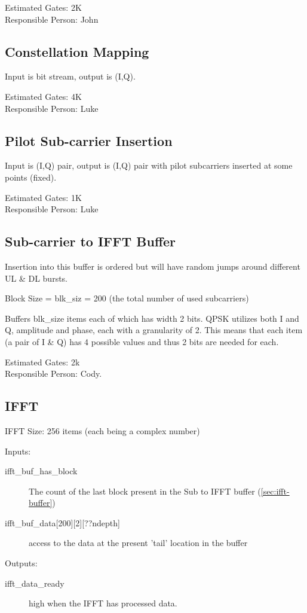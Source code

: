 \documentclass[dvips,10pt,twocolumn]{article}
\begin{document}
	Estimated Gates: 2K \\
	Responsible Person: John

	\subsection{Constellation Mapping}
	\label{sec:constellation}

	Input is bit stream, output is (I,Q).
	
	Estimated Gates: 4K \\
	Responsible Person: Luke

	\subsection{Pilot Sub-carrier Insertion}
	\label{sec:pilot}

	Input is (I,Q) pair, output is (I,Q) pair with pilot subcarriers
	inserted at some points (fixed).

	Estimated Gates: 1K \\
	Responsible Person: Luke

	\subsection{Sub-carrier to IFFT Buffer}
	\label{sec:ifft-buffer}
	Insertion into this buffer is ordered but will have random
	jumps around different UL \& DL bursts.

	Block Size = blk\_siz = 200 (the total number of used
	subcarriers)
	
	Buffers blk\_size items each of which has width 2 bits.
	QPSK utilizes both I and Q, amplitude and phase, each with
	a granularity of 2. This means that each item (a pair of I
	\& Q) has 4 possible values and thus 2 bits are needed for
	each.

	Estimated Gates: 2k \\
	Responsible Person: Cody.

	\subsection{IFFT}
	\label{sec:ifft}
	IFFT Size: 256 items (each being a complex number)
	\begin{description}
		\item{Inputs:}
		\begin{description}
			\item[ifft\_buf\_has\_block] The count of the last
				block present in the Sub to IFFT buffer
				(\autoref{sec:ifft-buffer})
			
			\item[ifft\_buf\_data{[200][2][??ndepth]}] access
				to the data at the present 'tail' location
				in the buffer
		\end{description}
		
		\item{Outputs:}
		\begin{description}
			\item[ifft\_data\_ready] high when the IFFT has
				processed data.
		\end{description}
	\end{description}
\end{document}
